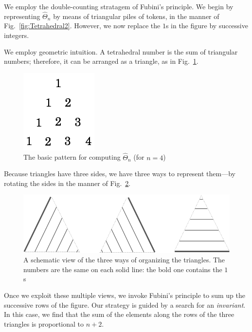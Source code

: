 We employ the double-counting stratagem of Fubini's principle.  We begin by representing $\widehat{\Theta}_n$ by means of triangular piles of tokens, in the manner of Fig.~\ref{fig:Tetrahedral2}.  However, we now replace the $1$s in the figure by successive integers.

\medskip

We employ geometric intuition.  A tetrahedral number is the sum of triangular numbers; therefore, it can be arranged as a triangle, as in Fig.~\ref{fig:Tetrahedral3}.
\begin{figure}[h]
\begin{center}
        \includegraphics[scale=0.35]{FiguresArithmetic/appTetrahedral3}
        \caption{The basic pattern for computing $\widehat{\Theta}_n$ (for $n=4$)}
        \label{fig:Tetrahedral3}
\end{center}
\end{figure}
Because triangles have three sides, we have three ways to represent them---by rotating the sides in the manner of Fig.~\ref{fig:Tetrahedral1}.
\begin{figure}[h]
\begin{center}
        \includegraphics[scale=0.3]{FiguresArithmetic/appTetrahedral1}
        \caption{A schematic view of the three ways of organizing the triangles.
        The numbers are the same on each solid line: the bold one contains the $1$s}
        \label{fig:Tetrahedral1}
\end{center}
\end{figure}
Once we exploit these multiple views, we invoke Fubini's principle to sum up the successive rows of the figure.  Our strategy is guided by a search for an {\em invariant}.  In this case, we find that the sum of the elements along the rows of the three triangles is proportional to $n+2$.

